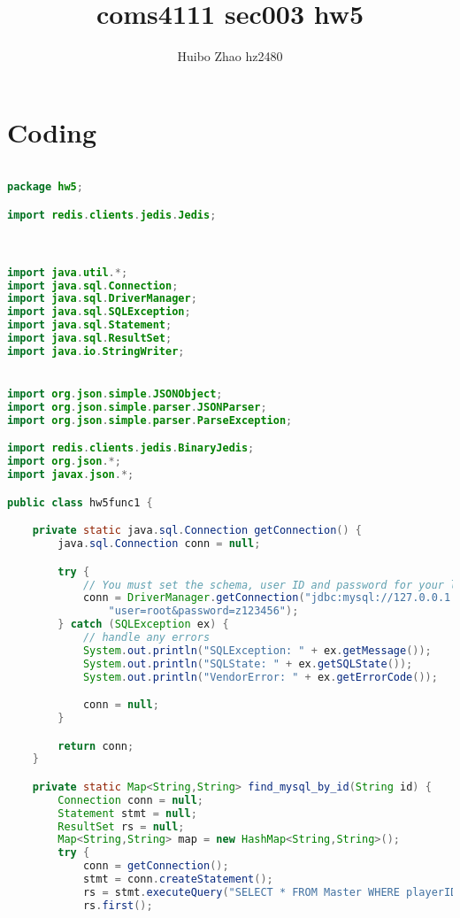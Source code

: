 \documentclass[11pt, oneside]{article}   	%
\title{coms4111 sec003 hw5}
\author{Huibo Zhao hz2480}
\begin{document}
\maketitle





\section*{Coding}


\begin{lstlisting}[language=java]

package hw5;

import redis.clients.jedis.Jedis;



import java.util.*;
import java.sql.Connection;
import java.sql.DriverManager;
import java.sql.SQLException;
import java.sql.Statement;
import java.sql.ResultSet;
import java.io.StringWriter;


import org.json.simple.JSONObject;
import org.json.simple.parser.JSONParser;
import org.json.simple.parser.ParseException;

import redis.clients.jedis.BinaryJedis;
import org.json.*;
import javax.json.*;

public class hw5func1 {

    private static java.sql.Connection getConnection() {
        java.sql.Connection conn = null;

        try {
            // You must set the schema, user ID and password for your local database.
            conn = DriverManager.getConnection("jdbc:mysql://127.0.0.1:3306/finalexamhw5?&useSSL=false&" +
                "user=root&password=z123456");
        } catch (SQLException ex) {
            // handle any errors
            System.out.println("SQLException: " + ex.getMessage());
            System.out.println("SQLState: " + ex.getSQLState());
            System.out.println("VendorError: " + ex.getErrorCode());

            conn = null;
        }

        return conn;
    }

    private static Map<String,String> find_mysql_by_id(String id) {
        Connection conn = null;
        Statement stmt = null;
        ResultSet rs = null;
        Map<String,String> map = new HashMap<String,String>();
        try {
            conn = getConnection();
            stmt = conn.createStatement();
            rs = stmt.executeQuery("SELECT * FROM Master WHERE playerID='" + id + "'");
            rs.first();


\end{lstlisting}
\end{document}
